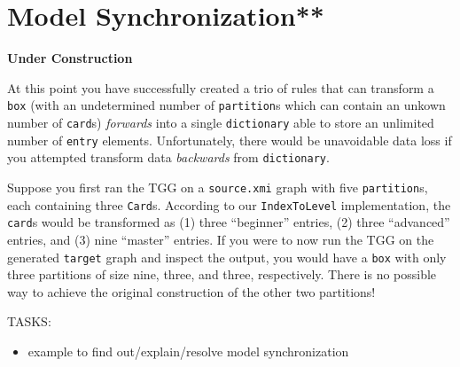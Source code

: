 \newpage
\section{Model Synchronization**}
\genHeader

{\bf Under Construction}

At this point you have successfully created a trio of rules that can transform a \texttt{box} (with an undetermined number of \texttt{partition}s which can
contain an unkown number of \texttt{card}s) \emph{forwards} into a single \texttt{dictionary} able to store an unlimited number of \texttt{entry} elements.
Unfortunately, there would be unavoidable data loss if you attempted transform data \emph{backwards} from \texttt{dictionary}.

Suppose you first ran the TGG on a \texttt{source.xmi} graph with five \texttt{partition}s, each containing three \texttt{Card}s. According to our
\texttt{IndexToLevel} implementation, the \texttt{card}s would be transformed as (1) three ``beginner'' entries, (2) three ``advanced'' entries, and (3)
nine ``master'' entries. If you were to now run the TGG on the generated \texttt{target} graph and inspect the output, you would have a \texttt{box} with
only three partitions of size nine, three, and three, respectively. There is no possible way to achieve the original construction of the other two partitions!

\vspace{1cm}

TASKS:

\begin{itemize}
  \item example to find out/explain/resolve model synchronization
\end{itemize}
